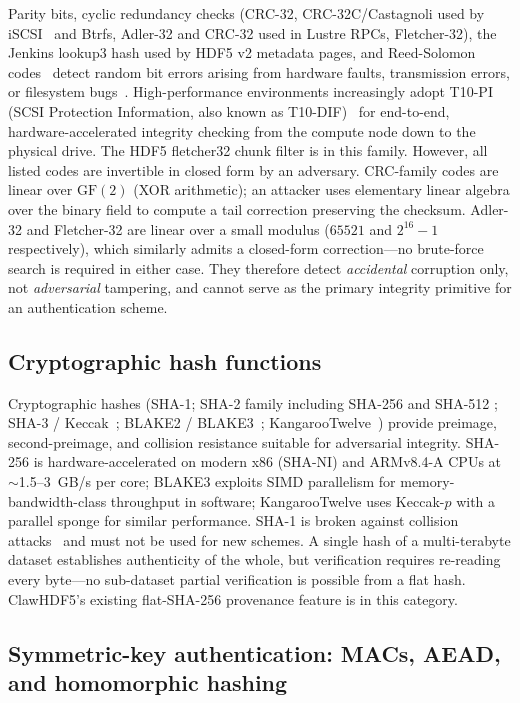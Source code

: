 \documentclass[11pt]{article}
\begin{document}
Parity bits, cyclic redundancy checks (CRC-32, CRC-32C/Castagnoli used by
iSCSI~\cite{rfc3385} and Btrfs, Adler-32 and CRC-32 used in Lustre RPCs,
Fletcher-32), the Jenkins lookup3 hash used by HDF5 v2 metadata pages, and
Reed-Solomon codes~\cite{reedsolomon} detect random bit errors arising from
hardware faults, transmission errors, or filesystem bugs~\cite{koopman2002crc}.
High-performance environments increasingly adopt T10-PI (SCSI Protection
Information, also known as T10-DIF)~\cite{t10dif} for end-to-end,
hardware-accelerated integrity checking from the compute node down to the
physical drive. The HDF5 fletcher32 chunk filter is in this family. However,
all listed codes are invertible in closed form by an adversary.
CRC-family codes are linear over $\mathrm{GF}(2)$ (XOR arithmetic); an attacker
uses elementary linear algebra over the binary field to compute a tail correction
preserving the checksum. Adler-32 and Fletcher-32 are linear over a small
modulus ($65521$ and $2^{16}-1$ respectively), which similarly admits a
closed-form correction---no brute-force search is required in either case.
They therefore detect
\emph{accidental} corruption only, not \emph{adversarial} tampering, and
cannot serve as the primary integrity primitive for an authentication scheme.

\subsection{Cryptographic hash functions}

Cryptographic hashes (SHA-1; SHA-2 family including SHA-256 and SHA-512
\cite{fips180}; SHA-3 / Keccak~\cite{fips202}; BLAKE2 / BLAKE3~\cite{blake3};
KangarooTwelve~\cite{k12}) provide preimage, second-preimage, and collision
resistance suitable for adversarial integrity. SHA-256 is hardware-accelerated
on modern x86 (SHA-NI) and ARMv8.4-A CPUs at $\sim$1.5--3~GB/s per core; BLAKE3
exploits SIMD parallelism for memory-bandwidth-class throughput in software;
KangarooTwelve uses Keccak-$p$ with a parallel sponge for similar performance.
SHA-1 is broken against collision attacks~\cite{stevens2017sha1} and must not
be used for new schemes. A single hash of a multi-terabyte dataset establishes
authenticity of the whole, but verification requires re-reading every byte---no
sub-dataset partial verification is possible from a flat hash. ClawHDF5's
existing flat-SHA-256 provenance feature is in this category.

\subsection{Symmetric-key authentication: MACs, AEAD, and homomorphic hashing}
\end{document}
